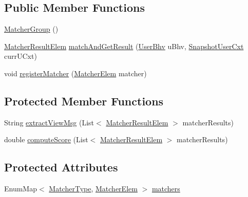 \subsection*{\-Public \-Member \-Functions}
\begin{DoxyCompactItemize}
\item 
\hyperlink{classlab_1_1davidahn_1_1appshuttle_1_1predict_1_1matcher_1_1_matcher_group_a5fca3df4b0fae7a544be238689d48597}{\-Matcher\-Group} ()
\item 
\hyperlink{classlab_1_1davidahn_1_1appshuttle_1_1predict_1_1matcher_1_1_matcher_result_elem}{\-Matcher\-Result\-Elem} \hyperlink{classlab_1_1davidahn_1_1appshuttle_1_1predict_1_1matcher_1_1_matcher_group_a95cbc5879b7443cbb5fa3adaa1701806}{match\-And\-Get\-Result} (\hyperlink{interfacelab_1_1davidahn_1_1appshuttle_1_1collect_1_1bhv_1_1_user_bhv}{\-User\-Bhv} u\-Bhv, \hyperlink{classlab_1_1davidahn_1_1appshuttle_1_1collect_1_1_snapshot_user_cxt}{\-Snapshot\-User\-Cxt} curr\-U\-Cxt)
\item 
void \hyperlink{classlab_1_1davidahn_1_1appshuttle_1_1predict_1_1matcher_1_1_matcher_group_a7d49a1ae78e9d2ca142fef432edfe14b}{register\-Matcher} (\hyperlink{classlab_1_1davidahn_1_1appshuttle_1_1predict_1_1matcher_1_1_matcher_elem}{\-Matcher\-Elem} matcher)
\end{DoxyCompactItemize}
\subsection*{\-Protected \-Member \-Functions}
\begin{DoxyCompactItemize}
\item 
\-String \hyperlink{classlab_1_1davidahn_1_1appshuttle_1_1predict_1_1matcher_1_1_matcher_group_a53f5f4c916fc06c718a16200bc0cc9cd}{extract\-View\-Msg} (\-List$<$ \hyperlink{classlab_1_1davidahn_1_1appshuttle_1_1predict_1_1matcher_1_1_matcher_result_elem}{\-Matcher\-Result\-Elem} $>$ matcher\-Results)
\item 
double \hyperlink{classlab_1_1davidahn_1_1appshuttle_1_1predict_1_1matcher_1_1_matcher_group_a85d262cd250cf0ad1039d36b97937271}{compute\-Score} (\-List$<$ \hyperlink{classlab_1_1davidahn_1_1appshuttle_1_1predict_1_1matcher_1_1_matcher_result_elem}{\-Matcher\-Result\-Elem} $>$ matcher\-Results)
\end{DoxyCompactItemize}
\subsection*{\-Protected \-Attributes}
\begin{DoxyCompactItemize}
\item 
\-Enum\-Map$<$ \hyperlink{enumlab_1_1davidahn_1_1appshuttle_1_1predict_1_1matcher_1_1_matcher_type}{\-Matcher\-Type}, \hyperlink{classlab_1_1davidahn_1_1appshuttle_1_1predict_1_1matcher_1_1_matcher_elem}{\-Matcher\-Elem} $>$ \hyperlink{classlab_1_1davidahn_1_1appshuttle_1_1predict_1_1matcher_1_1_matcher_group_ab17432693acbda36723f2ce33f8b5d24}{matchers}
\end{DoxyCompactItemize}


